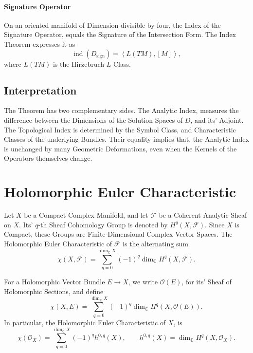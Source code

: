 \documentclass[a4paper, 10pt, onepage]{elegantbook}
\begin{document}
{\paragraph{Signature Operator}
On an oriented manifold of Dimension divisible by four, the Index of the Signature Operator, equals the Signature of the Intersection Form.
The Index Theorem expresses it as
\begin{equation}
\operatorname{ind}(D_{\mathrm{sign}})
=
\left\langle L(TM),[M]\right\rangle,
\end{equation}
where \(L(TM)\) is the Hirzebruch \(L\)-Class.

\subsection{Interpretation}

The Theorem has two complementary sides. The Analytic Index, measures the difference between the Dimensions of the Solution Spaces of \(D\), and its' Adjoint. The Topological Index is determined by the Symbol Class, and Characteristic Classes of the underlying Bundles. Their equality implies that, the Analytic Index is
unchanged by many Geometric Deformations, even when the Kernels of the Operators themselves change.

\section{Holomorphic Euler Characteristic}

Let \(X\) be a Compact Complex Manifold, and let \(\mathcal{F}\) be a Coherent Analytic Sheaf on \(X\). Its' \(q\)-th Sheaf Cohomology Group is
denoted by \(H^q(X,\mathcal{F})\). Since \(X\) is Compact, these Groups are Finite-Dimensional Complex Vector Spaces. The Holomorphic Euler Characteristic of \(\mathcal{F}\) is the alternating sum
\begin{equation}
\chi(X,\mathcal{F})
=
\sum_{q=0}^{\dim_{\mathbb{C}}X}
(-1)^q\dim_{\mathbb{C}}H^q(X,\mathcal{F}).
\end{equation}

For a Holomorphic Vector Bundle \(E\to X\), we write \(\mathcal{O}(E)\), for its' Sheaf of Holomorphic Sections, and define
\begin{equation}
\chi(X,E)
=
\sum_{q=0}^{\dim_{\mathbb{C}}X}
(-1)^q\dim_{\mathbb{C}}H^q(X,\mathcal{O}(E)).
\end{equation}
In particular, the Holomorphic Euler Characteristic of \(X\), is
\begin{equation}
\chi(\mathcal{O}_X)
=
\sum_{q=0}^{\dim_{\mathbb{C}}X}
(-1)^q h^{0,q}(X),
\qquad
h^{0,q}(X)=\dim_{\mathbb{C}}H^q(X,\mathcal{O}_X).
\end{equation}

}
\end{document}
